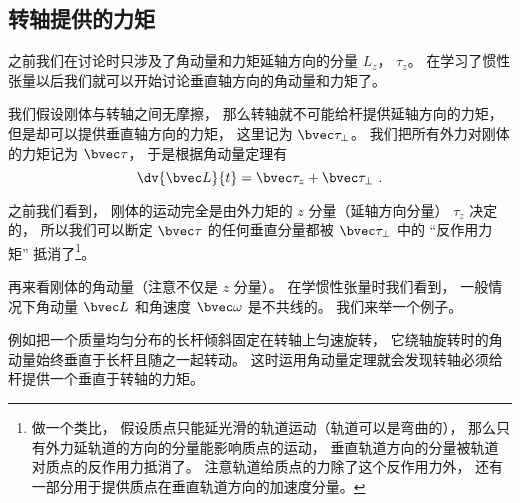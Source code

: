 
\begin{issues}
\issueDraft
\end{issues}


\subsection{转轴提供的力矩}
之前我们在讨论时只涉及了角动量和力矩延轴方向的分量 $L_z$， $\tau_z$。 在学习了惯性张量以后我们就可以开始讨论垂直轴方向的角动量和力矩了。


我们假设刚体与转轴之间无摩擦， 那么转轴就不可能给杆提供延轴方向的力矩， 但是却可以提供垂直轴方向的力矩， 这里记为 $\bvec\tau_\bot$。 我们把所有外力对刚体的力矩记为 $\bvec\tau$， 于是根据角动量定理有
\begin{equation}
\dv{\bvec L}{t} = \bvec\tau_z + \bvec\tau_\bot~.
\end{equation}

之前我们看到， 刚体的运动完全是由外力矩的 $z$ 分量（延轴方向分量） $\tau_z$ 决定的， 所以我们可以断定 $\bvec\tau$ 的任何垂直分量都被 $\bvec\tau_\bot$ 中的 “反作用力矩” 抵消了\footnote{做一个类比， 假设质点只能延光滑的轨道运动（轨道可以是弯曲的）， 那么只有外力延轨道的方向的分量能影响质点的运动， 垂直轨道方向的分量被轨道对质点的反作用力抵消了。 注意轨道给质点的力除了这个反作用力外， 还有一部分用于提供质点在垂直轨道方向的加速度分量。}。

再来看刚体的角动量（注意不仅是 $z$ 分量）。 在学惯性张量时我们看到， 一般情况下角动量 $\bvec L$ 和角速度 $\bvec \omega$ 是不共线的。 我们来举一个例子。


\begin{example}{}\label{ex_RBrot2_1}
例如把一个质量均匀分布的长杆倾斜固定在转轴上匀速旋转，%
它绕轴旋转时的角动量始终垂直于长杆且随之一起转动。 这时运用角动量定理就会发现转轴必须给杆提供一个垂直于转轴的力矩。
\end{example}
